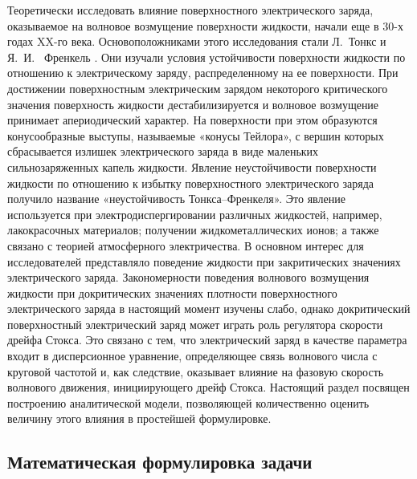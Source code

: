 Теоретически исследовать влияние поверхностного электрического заряда, оказываемое на волновое возмущение поверхности жидкости, начали еще в 30-х годах XX-го века. Основоположниками этого исследования стали Л.~Тонкс \parencite{tonks1935theory} и Я.~И.~ Френкель \parencite{Frenkel}. Они изучали условия устойчивости поверхности жидкости по отношению к электрическому заряду, распределенному на ее поверхности. При достижении поверхностным электрическим зарядом некоторого критического значения поверхность жидкости дестабилизируется и волновое возмущение принимает апериодический характер. На поверхности при этом образуются конусообразные выступы, называемые «конусы Тейлора», с вершин которых сбрасывается излишек электрического заряда в виде маленьких сильнозаряженных капель жидкости. Явление неустойчивости поверхности жидкости по отношению к избытку поверхностного электрического заряда получило название «неустойчивость Тонкса--Френкеля». Это явление используется при электродиспергировании различных жидкостей, например, лакокрасочных материалов; получении жидкометаллических ионов; а также связано с теорией атмосферного электричества. В основном интерес для исследователей представляло поведение жидкости при закритических значениях электрического заряда. Закономерности поведения волнового возмущения жидкости при докритических значениях плотности поверхностного электрического заряда в настоящий момент изучены слабо, однако докритический поверхностный электрический заряд может играть роль регулятора скорости дрейфа Стокса. Это связано с тем, что электрический заряд в качестве параметра входит в дисперсионное уравнение, определяющее связь волнового числа с круговой частотой и, как следствие, оказывает влияние на фазовую скорость волнового движения, инициирующего дрейф Стокса. Настоящий раздел посвящен построению аналитической модели, позволяющей количественно оценить величину этого влияния в простейшей формулировке.

\subsection{Математическая формулировка задачи}

